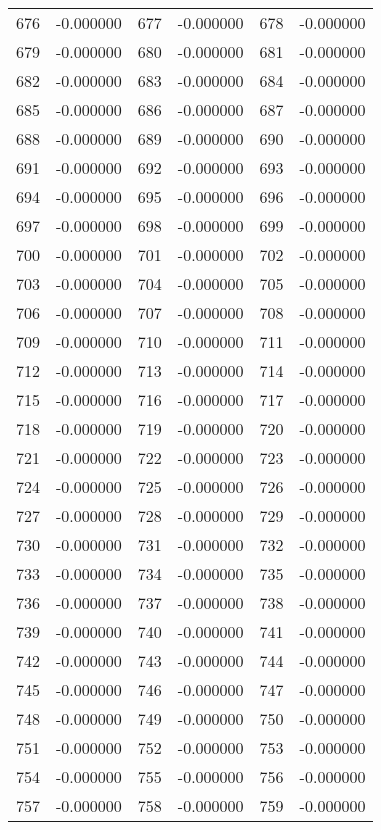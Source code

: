\documentclass[12pt]{article}
\begin{document}
\begin{longtable}{@{}cc|cc|cc@{}}
676 & -0.000000 & 677 & -0.000000 & 678 & -0.000000 \\
679 & -0.000000 & 680 & -0.000000 & 681 & -0.000000 \\
682 & -0.000000 & 683 & -0.000000 & 684 & -0.000000 \\
685 & -0.000000 & 686 & -0.000000 & 687 & -0.000000 \\
688 & -0.000000 & 689 & -0.000000 & 690 & -0.000000 \\
691 & -0.000000 & 692 & -0.000000 & 693 & -0.000000 \\
694 & -0.000000 & 695 & -0.000000 & 696 & -0.000000 \\
697 & -0.000000 & 698 & -0.000000 & 699 & -0.000000 \\
700 & -0.000000 & 701 & -0.000000 & 702 & -0.000000 \\
703 & -0.000000 & 704 & -0.000000 & 705 & -0.000000 \\
706 & -0.000000 & 707 & -0.000000 & 708 & -0.000000 \\
709 & -0.000000 & 710 & -0.000000 & 711 & -0.000000 \\
712 & -0.000000 & 713 & -0.000000 & 714 & -0.000000 \\
715 & -0.000000 & 716 & -0.000000 & 717 & -0.000000 \\
718 & -0.000000 & 719 & -0.000000 & 720 & -0.000000 \\
721 & -0.000000 & 722 & -0.000000 & 723 & -0.000000 \\
724 & -0.000000 & 725 & -0.000000 & 726 & -0.000000 \\
727 & -0.000000 & 728 & -0.000000 & 729 & -0.000000 \\
730 & -0.000000 & 731 & -0.000000 & 732 & -0.000000 \\
733 & -0.000000 & 734 & -0.000000 & 735 & -0.000000 \\
736 & -0.000000 & 737 & -0.000000 & 738 & -0.000000 \\
739 & -0.000000 & 740 & -0.000000 & 741 & -0.000000 \\
742 & -0.000000 & 743 & -0.000000 & 744 & -0.000000 \\
745 & -0.000000 & 746 & -0.000000 & 747 & -0.000000 \\
748 & -0.000000 & 749 & -0.000000 & 750 & -0.000000 \\
751 & -0.000000 & 752 & -0.000000 & 753 & -0.000000 \\
754 & -0.000000 & 755 & -0.000000 & 756 & -0.000000 \\
757 & -0.000000 & 758 & -0.000000 & 759 & -0.000000 \\

\end{longtable}
\end{document}
